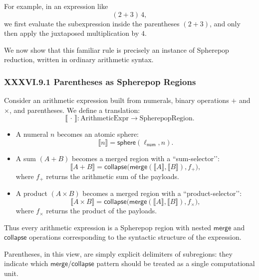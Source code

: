 \documentclass[12pt,letterpaper]{article}
\begin{document}
For example, in an expression like
\[
(2 + 3)\,4,
\]
we first evaluate the subexpression inside the parentheses $(2+3)$, and only
then apply the juxtaposed multiplication by $4$.

We now show that this familiar rule is precisely an instance of Spherepop
reduction, written in ordinary arithmetic syntax.

\subsubsection*{XXXVI.9.1 Parentheses as Spherepop Regions}

Consider an arithmetic expression built from numerals, binary operations
$+$ and $\times$, and parentheses. We define a translation:
\[
\llbracket \,\cdot\, \rrbracket : \text{ArithmeticExpr} \to \text{SpherepopRegion}.
\]

\begin{itemize}
  \item A numeral $n$ becomes an atomic sphere:
    \[
    \llbracket n \rrbracket = \mathsf{sphere}(\ell_{\mathsf{num}}, n).
    \]
  \item A sum $(A + B)$ becomes a merged region with a ``sum-selector’’:
    \[
    \llbracket A + B \rrbracket 
    = \mathsf{collapse}\big(
        \mathsf{merge}(\llbracket A \rrbracket, \llbracket B \rrbracket),
        f_{+}
      \big),
    \]
    where $f_{+}$ returns the arithmetic sum of the payloads.
  \item A product $(A \times B)$ becomes a merged region with a
        ``product-selector’’:
    \[
    \llbracket A \times B \rrbracket 
    = \mathsf{collapse}\big(
        \mathsf{merge}(\llbracket A \rrbracket, \llbracket B \rrbracket),
        f_{\times}
      \big),
    \]
    where $f_{\times}$ returns the product of the payloads.
\end{itemize}

Thus every arithmetic expression is a Spherepop region with nested
$\mathsf{merge}$ and $\mathsf{collapse}$ operations corresponding to the syntactic
structure of the expression.

Parentheses, in this view, are simply explicit delimiters of subregions:
they indicate which $\mathsf{merge}$/$\mathsf{collapse}$ pattern should be treated as a 
single computational unit.

\end{document}
